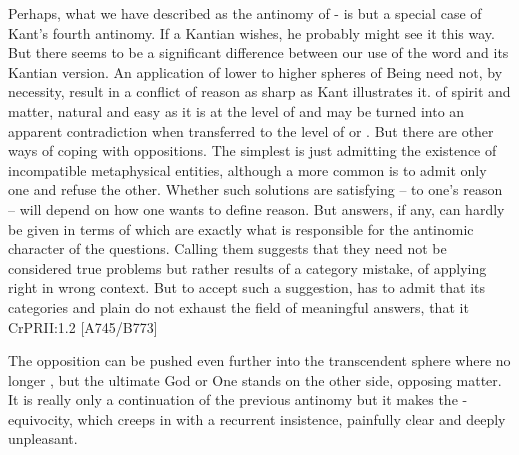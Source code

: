 \pa Perhaps, what we have described as the antinomy of -
is but a special case of Kant's fourth antinomy. If a Kantian wishes, he
probably might see it this way. But there seems to be a significant difference
between our use of the word  and its Kantian version.  An
application of lower  to higher spheres of Being need not, by
necessity, result in a conflict of reason as sharp as Kant illustrates it.
 of spirit and matter, natural and easy as it is at the level
of  and  may be turned into an apparent
contradiction when transferred to the level of  or .
But there are other ways of coping with  oppositions. The
simplest is just admitting the existence of incompatible metaphysical entities,
although a more common is to admit only one and refuse the other. Whether such
solutions are satisfying -- to one's reason -- will depend on how one wants to
define reason. But answers, if any, can hardly be given in terms of
 which are exactly what is responsible for the
antinomic character of the questions.  Calling them  suggests
that they need not be considered true problems but rather results of a category
mistake, of applying right  in wrong context. But to accept
such a suggestion,  has to admit that its 
categories and plain  do not exhaust the field of meaningful
answers, that it
  \citet{is benefited by the examination of a subject on both sides, and
    its judgments are corrected by being limited. [...] For it is perfectly
    permissible to employ, in the presence of reason, the language of a firmly
    rooted faith, even after we have been obliged to renounce all pretensions to
    knowledge.}{CrPR}{II:1.2 [A745/B773]}

\label{sub:Godmatter}\vspace*{-1ex}
\pa
The opposition can be pushed even further into the transcendent sphere where no
longer , but the ultimate God or One stands on the other side, 
opposing matter. It is really only a continuation of the previous antinomy but
it makes the - equivocity, which creeps in with a
recurrent insistence, painfully clear and deeply unpleasant. 

